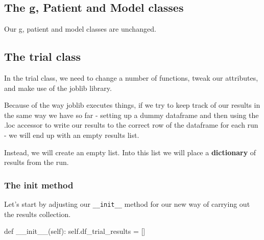 \documentclass[
  letterpaper,
  DIV=11,
  numbers=noendperiod]{scrreprt}
\newenvironment{Shaded}{\begin{snugshade}}{\end{snugshade}}
\newcommand{\FunctionTok}[1]{\textcolor[rgb]{0.28,0.35,0.67}{#1}}
\newcommand{\KeywordTok}[1]{\textcolor[rgb]{0.00,0.23,0.31}{#1}}
\newcommand{\NormalTok}[1]{\textcolor[rgb]{0.00,0.23,0.31}{#1}}
\newcommand{\OperatorTok}[1]{\textcolor[rgb]{0.37,0.37,0.37}{#1}}
\newcommand{\VariableTok}[1]{\textcolor[rgb]{0.07,0.07,0.07}{#1}}
\begin{document}
\subsection{The g, Patient and Model
classes}\label{the-g-patient-and-model-classes}

Our g, patient and model classes are unchanged.

\subsection{The trial class}\label{the-trial-class-11}

In the trial class, we need to change a number of functions, tweak our
attributes, and make use of the joblib library.

\begin{tcolorbox}[enhanced jigsaw, rightrule=.15mm, colback=white, colframe=quarto-callout-warning-color-frame, colbacktitle=quarto-callout-warning-color!10!white, toprule=.15mm, coltitle=black, opacityback=0, titlerule=0mm, bottomtitle=1mm, breakable, title=\textcolor{quarto-callout-warning-color}{\faExclamationTriangle}\hspace{0.5em}{Warning}, opacitybacktitle=0.6, toptitle=1mm, arc=.35mm, bottomrule=.15mm, leftrule=.75mm, left=2mm]

Because of the way joblib executes things, if we try to keep track of
our results in the same way we have so far - setting up a dummy
dataframe and then using the .loc accessor to write our results to the
correct row of the dataframe for each run - we will end up with an empty
results list.

Instead, we will create an empty list. Into this list we will place a
\textbf{dictionary} of results from the run.

\end{tcolorbox}

\subsubsection{\texorpdfstring{The \textbf{init}
method}{The init method}}\label{the-init-method-12}

Let's start by adjusting our \texttt{\_\_init\_\_} method for our new
way of carrying out the results collection.

\begin{Shaded}
\begin{Highlighting}[]
\KeywordTok{def}  \FunctionTok{\_\_init\_\_}\NormalTok{(}\VariableTok{self}\NormalTok{):}
    \VariableTok{self}\NormalTok{.df\_trial\_results }\OperatorTok{=}\NormalTok{ []}
\end{Highlighting}
\end{Shaded}
\end{document}
